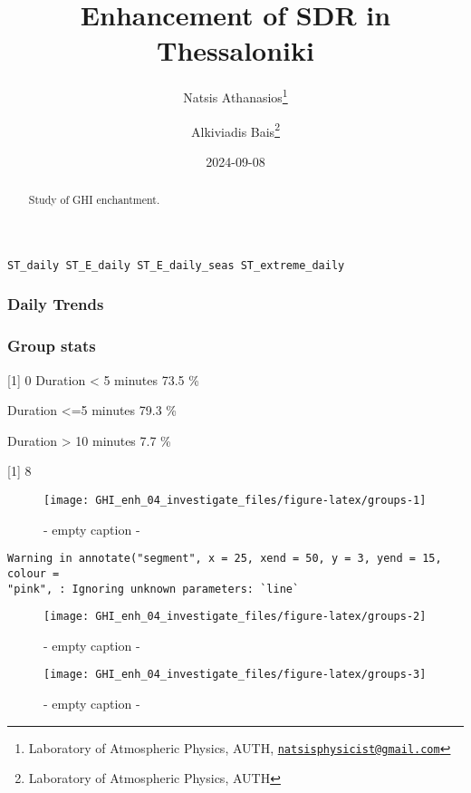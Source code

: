 \documentclass[
  10pt,
  a4paper,oneside]{article}
\title{Enhancement of SDR in Thessaloniki}
\author{Natsis Athanasios\footnote{Laboratory of Atmospheric Physics, AUTH, \href{mailto:natsisphysicist@gmail.com}{\nolinkurl{natsisphysicist@gmail.com}}} \and Alkiviadis Bais\footnote{Laboratory of Atmospheric Physics, AUTH}}
\date{2024-09-08}
\begin{document}
\maketitle
\begin{abstract}
Study of GHI enchantment.
\end{abstract}

{
\hypersetup{linkcolor=}
\setcounter{tocdepth}{4}
\tableofcontents
}
\begin{verbatim}
ST_daily ST_E_daily ST_E_daily_seas ST_extreme_daily
\end{verbatim}

\newpage
\FloatBarrier

\hypertarget{daily-trends}{%
\subsubsection{Daily Trends}\label{daily-trends}}

\newpage
\FloatBarrier

\hypertarget{group-stats}{%
\subsubsection{Group stats}\label{group-stats}}

{[}1{]} 0
Duration \textless{} 5 minutes 73.5 \%

Duration \textless=5 minutes 79.3 \%

Duration \textgreater{} 10 minutes 7.7 \%

{[}1{]} 8

\begin{figure}[H]

{\centering \texttt{[image: GHI\_enh\_04\_investigate\_files/figure-latex/groups-1]} 

}

\caption{ - empty caption - }\label{fig:groups-1}
\end{figure}

\begin{verbatim}
Warning in annotate("segment", x = 25, xend = 50, y = 3, yend = 15, colour =
"pink", : Ignoring unknown parameters: `line`
\end{verbatim}

\begin{figure}[H]

{\centering \texttt{[image: GHI\_enh\_04\_investigate\_files/figure-latex/groups-2]} 

}

\caption{ - empty caption - }\label{fig:groups-2}
\end{figure}
\begin{figure}[H]

{\centering \texttt{[image: GHI\_enh\_04\_investigate\_files/figure-latex/groups-3]} 

}

\caption{ - empty caption - }\label{fig:groups-3}
\end{figure}
\end{document}
